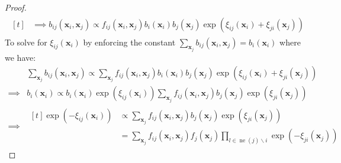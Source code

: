 \begin{proof}
\begin{align*}
\begin{aligned}[t]
            &\implies b_{ij}(\boldsymbol x_i, \boldsymbol x_j) \propto f_{ij}(\boldsymbol x_i, \boldsymbol x_j) b_i(\boldsymbol x_i)b_j(\boldsymbol x_j) \exp(\xi_{ij}(\boldsymbol x_i) + \xi_{ji}(\boldsymbol x_j))
        \end{aligned}
    \end{align*}
    To solve for $\xi_{ij}(\boldsymbol x_i)$ by enforcing the constant $\sum_{\boldsymbol x_j}b_{ij}(\boldsymbol x_i, \boldsymbol x_j) = b_i(\boldsymbol x_i)$ where we have:
    \begin{equation*}
    \begin{aligned}
        &\sum_{\boldsymbol x_j} b_{ij}(\boldsymbol x_i, \boldsymbol x_j) \propto \sum_{\boldsymbol x_j}f_{ij}(\boldsymbol x_i, \boldsymbol x_j)b_i(\boldsymbol x_i)b_j(\boldsymbol x_j)\exp(\xi_{ij}(\boldsymbol x_i) + \xi_{ji}(\boldsymbol x_j)) \\
        \implies& b_i(\boldsymbol x_i) \propto b_i(\boldsymbol x_i)\exp(\xi_{ij}(\boldsymbol x_i))\sum_{\boldsymbol x_j}f_{ij}(\boldsymbol x_i, \boldsymbol x_j)b_j(\boldsymbol x_j)\exp(\xi_{ji}(\boldsymbol x_j)) \\
        \implies& \begin{aligned}[t]
            \exp(-\xi_{ij}(\boldsymbol x_i)) &\propto \sum_{\boldsymbol x_j}f_{ij}(\boldsymbol x_i, \boldsymbol x_j)b_j(\boldsymbol x_j)\exp(\xi_{ji}(\boldsymbol x_j)) \\
            &= \sum_{\boldsymbol x_j}f_{ij}(\boldsymbol x_i, \boldsymbol x_j)f_j(\boldsymbol x_j)\prod_{l\in\operatorname{ne}(j)\backslash i}\exp(-\xi_{ji}(\boldsymbol x_j))
        \end{aligned}
    \end{aligned}
    \end{equation*}
\end{proof}

